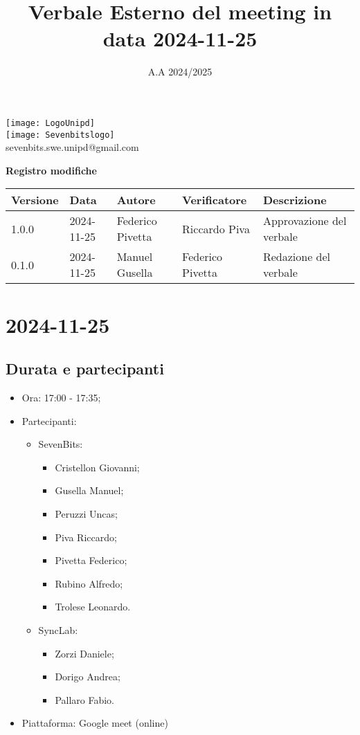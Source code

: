 \documentclass[12pt]{article}
\title{Verbale Esterno del meeting in data 2024-11-25}
\date{A.A 2024/2025}
\begin{document}
\maketitle
\begin{center}
\texttt{[image: LogoUnipd]}\\
\texttt{[image: Sevenbitslogo]}\\
sevenbits.swe.unipd@gmail.com\\
\vspace{2mm}

\textbf{Registro modifiche}\\
\vspace{2mm}
\begin{tabularx}{\textwidth}{|l|l|l|l|X|}
\hline
\textbf{Versione} & \textbf{Data} & \textbf{Autore} & \textbf{Verificatore} & \textbf{Descrizione} \\
\hline
1.0.0 & 2024-11-25 & Federico Pivetta & Riccardo Piva & Approvazione del verbale\\
\hline
0.1.0 & 2024-11-25 & Manuel Gusella & Federico Pivetta & Redazione del verbale\\
\hline

\end{tabularx}
\end{center}
\newpage
\tableofcontents
\newpage
\section{2024-11-25}
\subsection{Durata e partecipanti}
\begin{itemize}
\item Ora: 17:00 - 17:35;
\item Partecipanti: 	
	\begin{itemize}
        \item SevenBits:
        \begin{itemize}
        	\item Cristellon Giovanni;
			\item Gusella Manuel;
			\item Peruzzi Uncas;
			\item Piva Riccardo;
			\item Pivetta Federico;
			\item Rubino Alfredo;
			\item Trolese Leonardo.
		\end{itemize}
		\item SyncLab:
		\begin{itemize}
			\item Zorzi Daniele;
			\item Dorigo Andrea;
			\item Pallaro Fabio.
		\end{itemize}
	\end{itemize}
\item Piattaforma: Google meet (online)
\end{itemize}
\end{document}
